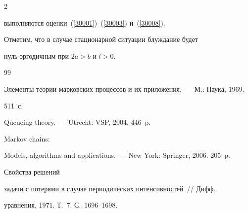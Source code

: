 \begin{multicols}{2}


выполняются оценки~(\ref{30001})--(\ref{30003}) и~(\ref{30008}).





             \medskip





Отметим, что в случае стационарной ситуации блуждание будет


нуль-эргодичным при $2a > b$ и $l > 0$.








{\small\frenchspacing


{%




\begin{thebibliography}{99}









Элементы теории марковских  процессов и их приложения.~--- М.: Наука, 1969.


511~с.









Queueing theory.~--- Utrecht: VSP, 2004. 446~p.









Markov chains:


Models, algorithms and applications.~--- New York: Springer, 2006. 205~p.









Свойства решений


задачи с потерями в случае периодических интенсивностей~// Дифф.


уравнения, 1971. Т.~7. С.~1696--1698.






\end{thebibliography}}}
\end{multicols}
